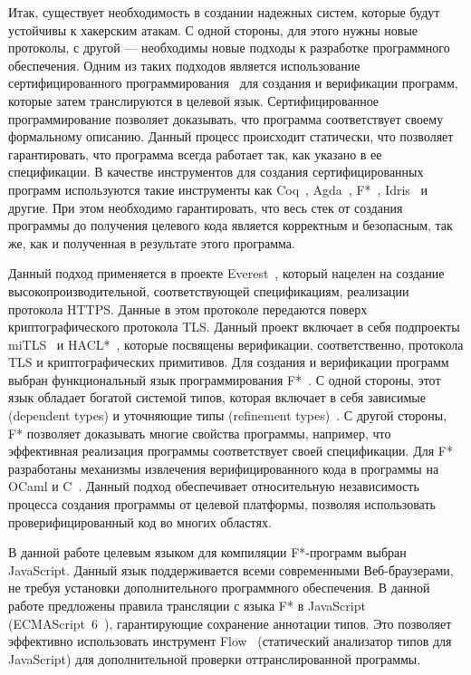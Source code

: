 Итак, существует необходимость в создании надежных систем, которые будут устойчивы к хакерским атакам. С одной стороны, для этого нужны новые протоколы, с другой --- необходимы новые подходы к разработке программного обеспечения. Одним из таких подходов является использование сертифицированного программирования~\cite{certifiedProgramming} для создания и верификации программ, которые затем транслируются в целевой язык. Сертифицированное программирование позволяет доказывать, что программа соответствует своему формальному описанию. Данный процесс происходит статически, что позволяет гарантировать, что программа всегда работает так, как указано в ее спецификации. В качестве инструментов для создания сертифицированных программ используются такие инструменты как Coq~\cite{coq}, Agda~\cite{agda}, F*~\cite{fstar}, Idris~\cite{idris} и другие.  При этом необходимо гарантировать, что весь стек от создания программы до получения целевого кода является корректным и безопасным, так же, как и полученная в результате этого программа. 

Данный подход применяется в проекте Everest~\cite{everest}, который нацелен на создание высокопроизводительной, соответствующей спецификациям, реализации протокола HTTPS. Данные в этом протоколе передаются поверх криптографического протокола TLS. Данный проект включает в себя подпроекты miTLS~\cite{mitls} и HACL*~\cite{hacl_star}, которые посвящены верификации, соответственно, протокола TLS и криптографических примитивов. Для создания и верификации программ выбран функциональный язык программирования F*~\cite{fstarCite}. С одной стороны, этот язык обладает богатой системой типов, которая включает в себя зависимые (dependent types) и уточняющие типы (refinement types)~\cite{certifiedProgramming}. С другой стороны, F* позволяет доказывать многие свойства программы, например, что эффективная реализация программы соответствует своей спецификации. Для F* разработаны механизмы извлечения верифицированного кода в программы на OCaml и C~\cite{kremlin}. Данный подход обеспечивает относительную независимость процесса создания программы от целевой платформы, позволяя использовать проверифицированный код во многих областях. 

В данной работе целевым языком для компиляции F*-программ выбран JavaScript. Данный язык поддерживается всеми современными Веб-браузерами, не требуя установки дополнительного программного обеспечения. В данной работе предложены правила трансляции с языка F* в JavaScript (ECMAScript~6~\cite{specjs}), гарантирующие сохранение аннотации типов. Это позволяет эффективно использовать инструмент Flow~\cite{flow} (статический анализатор типов для JavaScript) для дополнительной проверки оттранслированной программы. %

